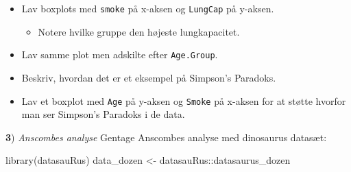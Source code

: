 \documentclass[
]{book}
\newenvironment{Shaded}{\begin{snugshade}}{\end{snugshade}}
\newcommand{\AttributeTok}[1]{\textcolor[rgb]{0.77,0.63,0.00}{#1}}
\newcommand{\ConstantTok}[1]{\textcolor[rgb]{0.00,0.00,0.00}{#1}}
\newcommand{\DecValTok}[1]{\textcolor[rgb]{0.00,0.00,0.81}{#1}}
\newcommand{\FunctionTok}[1]{\textcolor[rgb]{0.00,0.00,0.00}{#1}}
\newcommand{\NormalTok}[1]{#1}
\newcommand{\OtherTok}[1]{\textcolor[rgb]{0.56,0.35,0.01}{#1}}
\newcommand{\SpecialCharTok}[1]{\textcolor[rgb]{0.00,0.00,0.00}{#1}}
\newcommand{\StringTok}[1]{\textcolor[rgb]{0.31,0.60,0.02}{#1}}
\providecommand{\tightlist}{%
  \setlength{\itemsep}{0pt}\setlength{\parskip}{0pt}}
\begin{document}
\begin{Shaded}
\end{Shaded}

\begin{itemize}
\tightlist
\item
  Lav boxplots med \texttt{smoke} på x-aksen og \texttt{LungCap} på y-aksen.

  \begin{itemize}
  \tightlist
  \item
    Notere hvilke gruppe den højeste lungkapacitet.
  \end{itemize}
\item
  Lav samme plot men adskilte efter \texttt{Age.Group}.
\item
  Beskriv, hvordan det er et eksempel på Simpson's Paradoks.
\item
  Lav et boxplot med \texttt{Age} på y-aksen og \texttt{Smoke} på x-aksen for at støtte hvorfor man ser Simpson's Paradoks i de data.
\end{itemize}

\textbf{3}) \emph{Anscombes analyse} Gentage Anscombes analyse med dinosaurus datasæt:

\begin{Shaded}
\begin{Highlighting}[]
\FunctionTok{library}\NormalTok{(datasauRus)}
\NormalTok{data\_dozen }\OtherTok{\textless{}{-}}\NormalTok{ datasauRus}\SpecialCharTok{::}\NormalTok{datasaurus\_dozen}
\end{Highlighting}
\end{Shaded}
\end{document}
